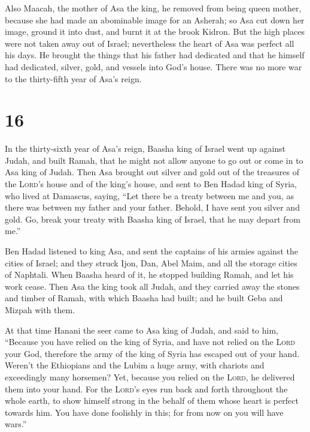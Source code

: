  Also Maacah, the mother of Asa the king, he removed from
being queen mother, because she had made an abominable image for an
Asherah; so Asa cut down her image, ground it into dust, and burnt it at
the brook Kidron.  But the high places were not taken
away out of Israel; nevertheless the heart of Asa was perfect all his
days.  He brought the things that his father had
dedicated and that he himself had dedicated, silver, gold, and vessels
into God's house.  There was no more war to the
thirty-fifth year of Asa's reign.

\hypertarget{section-15}{%
\section{16}\label{section-15}}

 In the thirty-sixth year of Asa's reign, Baasha king of
Israel went up against Judah, and built Ramah, that he might not allow
anyone to go out or come in to Asa king of Judah.  Then
Asa brought out silver and gold out of the treasures of the
\textsc{Lord}'s house and of the king's house, and sent to Ben Hadad
king of Syria, who lived at Damascus, saying,  ``Let there
be a treaty between me and you, as there was between my father and your
father. Behold, I have sent you silver and gold. Go, break your treaty
with Baasha king of Israel, that he may depart from me.''

 Ben Hadad listened to king Asa, and sent the captains of
his armies against the cities of Israel; and they struck Ijon, Dan, Abel
Maim, and all the storage cities of Naphtali.  When Baasha
heard of it, he stopped building Ramah, and let his work cease.
 Then Asa the king took all Judah, and they carried away
the stones and timber of Ramah, with which Baasha had built; and he
built Geba and Mizpah with them.

 At that time Hanani the seer came to Asa king of Judah,
and said to him, ``Because you have relied on the king of Syria, and
have not relied on the \textsc{Lord} your God, therefore the army of the
king of Syria has escaped out of your hand.  Weren't the
Ethiopians and the Lubim a huge army, with chariots and exceedingly many
horsemen? Yet, because you relied on the \textsc{Lord}, he delivered
them into your hand.  For the \textsc{Lord}'s eyes run
back and forth throughout the whole earth, to show himself strong in the
behalf of them whose heart is perfect towards him. You have done
foolishly in this; for from now on you will have wars.''

